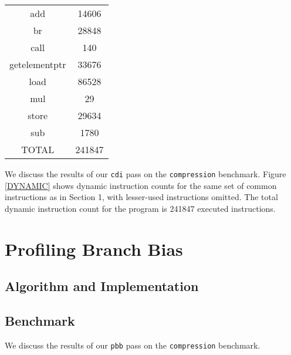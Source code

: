 \documentclass[12pt]{article}
\begin{document}
\begin{figure*}[!t]
\begin{center}
\begin{tabular} { |c|c| }
\hline
	add & 14606 \\
	br & 28848 \\
	call & 140 \\
	getelementptr & 33676 \\
	load & 86528 \\
	mul & 29 \\
	store & 29634 \\
	sub & 1780 \\
	TOTAL & 241847 \\
\hline
\end{tabular}
\caption{Selected dynamic instruction counts from the {\tt compression} benchmark}
\label{DYNAMIC}
\end{center}
\end{figure*}

We discuss the results of our {\tt cdi} pass on the {\tt compression} benchmark. Figure \ref{DYNAMIC} shows dynamic instruction counts for the same set of common instructions as in Section 1, with lesser-used instructions omitted. The total dynamic instruction count for the program is 241847 executed instructions. 

\section{Profiling Branch Bias}

\subsection{Algorithm and Implementation}

\subsection{Benchmark}

We discuss the results of our {\tt pbb} pass on the {\tt compression} benchmark. 
\end{document}
